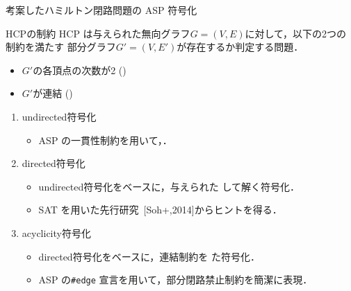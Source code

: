 \documentclass[dvipdfmx]{beamer}
\begin{document}
\begin{frame}{考案したハミルトン閉路問題の ASP 符号化}

\begin{block}{HCPの制約}
  HCP は与えられた無向グラフ$G= (V,E)$に対して，以下の2つの制約を満たす
  部分グラフ$G'= (V,E')$が存在するか判定する問題．
  \begin{itemize}
  \item $G'$の各頂点の次数が2 ()
  \item $G'$が連結 ()
  \end{itemize}
\end{block}

\begin{enumerate}
\item \alert{\textsf{undirected}符号化}
  \begin{itemize}
  \item ASP の一貫性制約を用いて，．
  \end{itemize}
\item \alert{\textsf{directed}符号化}
  \begin{itemize}
  \item \textsf{undirected}符号化をベースに，与えられた
    して解く符号化．
  \item SAT を用いた先行研究~{\scriptsize[Soh+,2014]}からヒントを得る．
  \end{itemize}
\item \alert{\textsf{acyclicity}符号化}
  \begin{itemize}
  \item \textsf{directed}符号化をベースに，連結制約を
    た符号化．
  \item ASP の\texttt{\#edge} 宣言を用いて，部分閉路禁止制約を簡潔に表現．
  \end{itemize}
\end{enumerate}
\end{frame}
\end{document}
